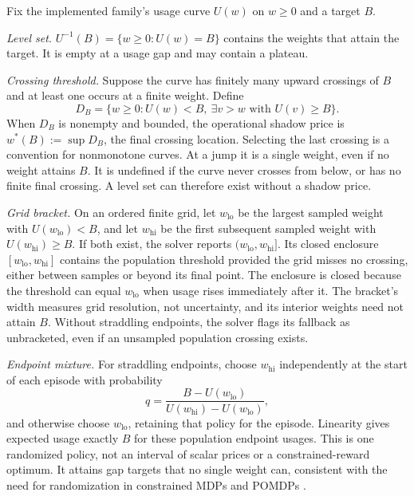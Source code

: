 \documentclass[manuscript, screen, review]{jair}
\begin{document}
\begin{definition}
\label{def:pi3}
Fix the implemented family's usage curve $U(w)$ on $w\ge0$ and a target $B$.

\emph{Level set.} $U^{-1}(B)=\{w\ge0:U(w)=B\}$ contains the weights that attain the target. It is empty at a usage gap and may contain a plateau.

\emph{Crossing threshold.} Suppose the curve has finitely many upward crossings of $B$ and at least one occurs at a finite weight. Define
\[
D_B=\{w\ge0:U(w)<B,\ \exists v>w\text{ with }U(v)\ge B\}.
\]
When $D_B$ is nonempty and bounded, the operational shadow price is $w^*(B):=\sup D_B$, the final crossing location. Selecting the last crossing is a convention for nonmonotone curves. At a jump it is a single weight, even if no weight attains $B$. It is undefined if the curve never crosses from below, or has no finite final crossing. A level set can therefore exist without a shadow price.

\emph{Grid bracket.} On an ordered finite grid, let $w_{\mathrm{lo}}$ be the largest sampled weight with $U(w_{\mathrm{lo}})<B$, and let $w_{\mathrm{hi}}$ be the first subsequent sampled weight with $U(w_{\mathrm{hi}})\ge B$. If both exist, the solver reports $(w_{\mathrm{lo}},w_{\mathrm{hi}}]$. Its closed enclosure $[w_{\mathrm{lo}},w_{\mathrm{hi}}]$ contains the population threshold provided the grid misses no crossing, either between samples or beyond its final point. The enclosure is closed because the threshold can equal $w_{\mathrm{lo}}$ when usage rises immediately after it. The bracket's width measures grid resolution, not uncertainty, and its interior weights need not attain $B$. Without straddling endpoints, the solver flags its fallback as unbracketed, even if an unsampled population crossing exists.

\emph{Endpoint mixture.} For straddling endpoints, choose $w_{\mathrm{hi}}$ independently at the start of each episode with probability
\[
q=\frac{B-U(w_{\mathrm{lo}})}{U(w_{\mathrm{hi}})-U(w_{\mathrm{lo}})},
\]
and otherwise choose $w_{\mathrm{lo}}$, retaining that policy for the episode. Linearity gives expected usage exactly $B$ for these population endpoint usages. This is one randomized policy, not an interval of scalar prices or a constrained-reward optimum. It attains gap targets that no single weight can, consistent with the need for randomization in constrained MDPs and POMDPs \citep{altman1999,kim2011cpomdp}.
\end{definition}
\end{document}
